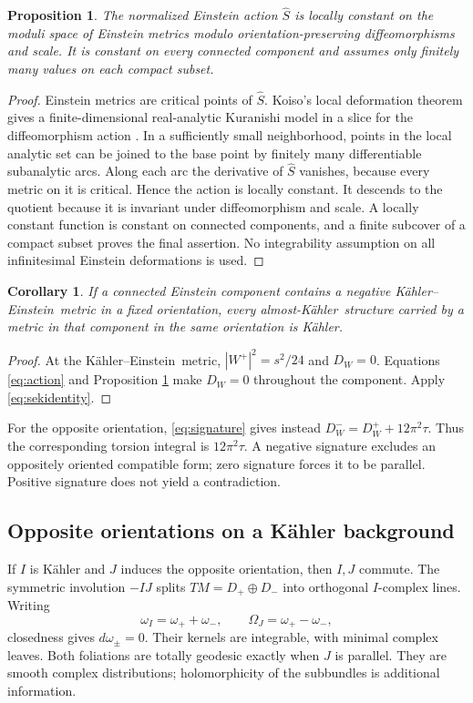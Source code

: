 \documentclass[11pt,a4paper]{article}
\newtheorem{proposition}[theorem]{Proposition}
\newtheorem{corollary}[theorem]{Corollary}
\theoremstyle{definition}
\theoremstyle{remark}
\newcommand{\AK}{almost-K\"ahler}
\newcommand{\KE}{K\"ahler--Einstein}
\begin{document}
\begin{proposition}\label{prop:actionconstant}
The normalized Einstein action $\widehat S$ is locally constant on the moduli space of Einstein metrics modulo orientation-preserving diffeomorphisms and scale. It is constant on every connected component and assumes only finitely many values on each compact subset.
\end{proposition}
\begin{proof}
Einstein metrics are critical points of $\widehat S$. Koiso's local deformation theorem gives a finite-dimensional real-analytic Kuranishi model in a slice for the diffeomorphism action \cite{Koiso,Besse}. In a sufficiently small neighborhood, points in the local analytic set can be joined to the base point by finitely many differentiable subanalytic arcs. Along each arc the derivative of $\widehat S$ vanishes, because every metric on it is critical. Hence the action is locally constant. It descends to the quotient because it is invariant under diffeomorphism and scale. A locally constant function is constant on connected components, and a finite subcover of a compact subset proves the final assertion. No integrability assumption on all infinitesimal Einstein deformations is used.
\end{proof}

\begin{corollary}\label{cor:component}
If a connected Einstein component contains a negative \KE\ metric in a fixed orientation, every \AK\ structure carried by a metric in that component in the same orientation is K\"ahler.
\end{corollary}
\begin{proof}
At the \KE\ metric, $|W^+|^2=s^2/24$ and $D_W=0$. Equations \eqref{eq:action} and Proposition \ref{prop:actionconstant} make $D_W=0$ throughout the component. Apply \eqref{eq:sekidentity}.
\end{proof}
For the opposite orientation, \eqref{eq:signature} gives instead $D_W^-=D_W^++12\pi^2\tau$. Thus the corresponding torsion integral is $12\pi^2\tau$. A negative signature excludes an oppositely oriented compatible form; zero signature forces it to be parallel. Positive signature does not yield a contradiction.

\subsection{Opposite orientations on a K\"ahler background}
If $I$ is K\"ahler and $J$ induces the opposite orientation, then $I,J$ commute. The symmetric involution $-IJ$ splits $TM=D_+\oplus D_-$ into orthogonal $I$-complex lines. Writing
\[
 \omega_I=\omega_++\omega_-,\qquad \Omega_J=\omega_+-\omega_-,
\]
closedness gives $d\omega_\pm=0$. Their kernels are integrable, with minimal complex leaves. Both foliations are totally geodesic exactly when $J$ is parallel. They are smooth complex distributions; holomorphicity of the subbundles is additional information.
\end{document}
